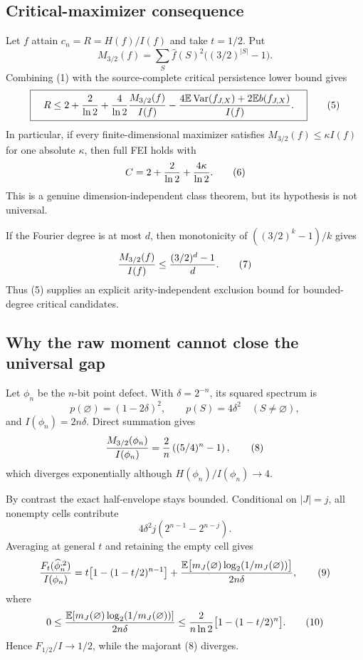 \subsection*{Critical-maximizer consequence}

Let $f$ attain $c_n=R=H(f)/I(f)$ and take $t=1/2$. Put
\[
 M_{3/2}(f)=\sum_S\widehat f(S)^2\bigl((3/2)^{|S|}-1\bigr).
\]
Combining (1) with the source-complete critical persistence lower bound gives
\[
 \boxed{\quad
 R\le 2+{2\over\ln2}+{4\over\ln2}{M_{3/2}(f)\over I(f)}
 -{4\mathbb E\operatorname{Var}(f_{J,X})
        +2\mathbb E b(f_{J,X})\over I(f)}.\quad}        \tag{5}
\]
In particular, if every finite-dimensional maximizer satisfies
$M_{3/2}(f)\le\kappa I(f)$ for one absolute $\kappa$, then full FEI holds
with
\[
 C=2+{2\over\ln2}+{4\kappa\over\ln2}.                 \tag{6}
\]
This is a genuine dimension-independent class theorem, but its hypothesis is
not universal.

If the Fourier degree is at most $d$, then monotonicity of
$((3/2)^k-1)/k$ gives
\[
 {M_{3/2}(f)\over I(f)}\le{(3/2)^d-1\over d}.          \tag{7}
\]
Thus (5) supplies an explicit arity-independent exclusion bound for
bounded-degree critical candidates.

\subsection*{Why the raw moment cannot close the universal gap}

Let $\phi_n$ be the $n$-bit point defect. With $\delta=2^{-n}$, its squared
spectrum is
\[
 p(\varnothing)=(1-2\delta)^2,\qquad p(S)=4\delta^2
 \quad(S\ne\varnothing),
\]
and $I(\phi_n)=2n\delta$. Direct summation gives
\[
 {M_{3/2}(\phi_n)\over I(\phi_n)}
 ={2\over n}\left((5/4)^n-1\right),                   \tag{8}
\]
which diverges exponentially although $H(\phi_n)/I(\phi_n)\to4$.

By contrast the exact half-envelope stays bounded. Conditional on $|J|=j$,
all nonempty cells contribute
\[
 4\delta^2j(2^{n-1}-2^{n-j}).
\]
Averaging at general $t$ and retaining the empty cell gives
\[
 {F_t(\widehat\phi_n^{,2})\over I(\phi_n)}
 =t\bigl[1-(1-t/2)^{n-1}\bigr]
 +{\mathbb E\bigl[m_J(\varnothing)
       \log_2(1/m_J(\varnothing))\bigr]\over2n\delta},                \tag{9}
\]
where
\[
 0\le {\mathbb E[m_J(\varnothing)\log_2(1/m_J(\varnothing))]
          \over2n\delta}
 \le {2\over n\ln2}\bigl[1-(1-t/2)^n\bigr].           \tag{10}
\]
Hence $F_{1/2}/I\to1/2$, while the majorant (8) diverges.


